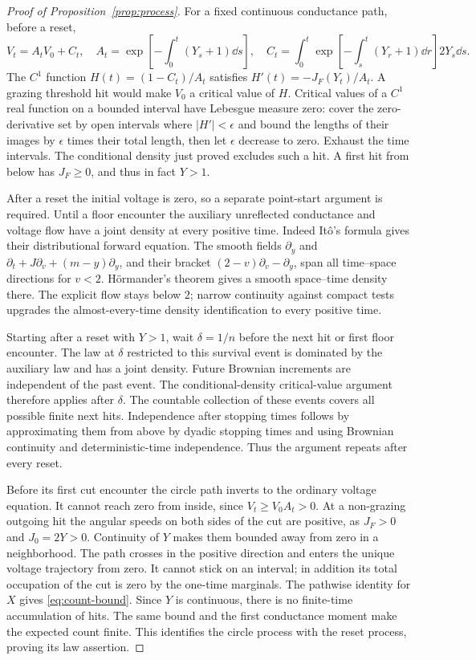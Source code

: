 \begin{proof}[Proof of Proposition~\ref{prop:process}]
For a fixed continuous conductance path, before a reset,
\begin{equation}\label{eq:voltage-flow}
 V_t=A_tV_0+C_t,\quad
 A_t=\exp\!\left[-\int_0^t(Y_s+1)\dd s\right],\quad
 C_t=\int_0^t\exp\!\left[-\int_s^t(Y_r+1)\dd r\right]2Y_s\dd s .
\end{equation}
The $C^1$ function $H(t)=(1-C_t)/A_t$ satisfies
$H'(t)=-J_F(Y_t)/A_t$. A grazing threshold hit would make
$V_0$ a critical value of $H$. Critical values of a $C^1$
real function on a bounded interval have Lebesgue measure
zero: cover the zero-derivative set by open intervals where
$|H'|<\epsilon$ and bound the lengths of their images by
$\epsilon$ times their total length, then let $\epsilon$
decrease to zero. Exhaust the time intervals.
The conditional density just proved excludes such a hit.
A first hit from below has $J_F\ge0$, and thus in fact $Y>1$.

After a reset the initial voltage is zero, so a separate
point-start argument is required. Until a floor encounter the
auxiliary unreflected conductance and voltage flow have a joint
density at every positive time. Indeed It\^o's formula gives
their distributional forward equation. The smooth fields
$\partial_y$ and
$\partial_t+J\partial_v+(m-y)\partial_y$, and their bracket
$(2-v)\partial_v-\partial_y$, span all time--space directions
for $v<2$. H\"ormander's theorem
\cite[Theorem 1.1]{Hormander67} gives a smooth space--time
density there. The explicit flow stays below $2$; narrow
continuity against compact tests upgrades the almost-every-time
density identification to every positive time.

Starting after a reset with $Y>1$, wait $\delta=1/n$ before the
next hit or first floor encounter. The law at $\delta$ restricted
to this survival event is dominated by the auxiliary law and
has a joint density. Future Brownian increments are independent
of the past event. The conditional-density critical-value
argument therefore applies after $\delta$.
The countable collection of these events covers all possible
finite next hits. Independence after stopping times follows by
approximating them from above by dyadic stopping times and
using Brownian continuity and deterministic-time independence.
Thus the argument repeats after every reset.

Before its first cut encounter the circle path inverts to the
ordinary voltage equation. It cannot reach zero from inside,
since $V_t\ge V_0A_t>0$. At a non-grazing outgoing hit the
angular speeds on both sides of the cut are positive, as
$J_F>0$ and $J_0=2Y>0$. Continuity of $Y$ makes them bounded
away from zero in a neighborhood. The path crosses in the
positive direction and enters the unique voltage trajectory
from zero. It cannot stick on an interval; in addition its
total occupation of the cut is zero by the one-time marginals.
The pathwise identity for $X$ gives \eqref{eq:count-bound}.
Since $Y$ is continuous, there is no finite-time accumulation
of hits. The same bound and the first conductance moment make
the expected count finite. This identifies the circle process
with the reset process, proving its law assertion.


\end{proof}
